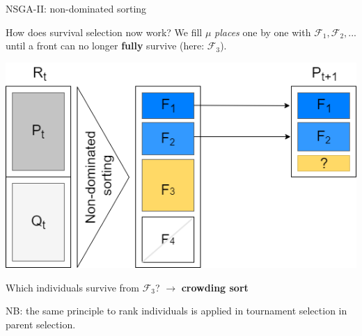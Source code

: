 \begin{frame}[allowframebreaks]{NSGA-II: non-dominated sorting}
\framebreak

How does survival selection now work? We fill $\mu$ \textit{places} one by one with $\mathcal{F}_1, \mathcal{F}_2, ...$ until a front can no longer \textbf{fully} survive (here: $\mathcal{F}_3$).

\begin{center}
\includegraphics[width = 0.45\linewidth]{images/NSGA2_2.png}
\end{center}

Which individuals survive from $\mathcal{F}_3$? $\to$ \textbf{crowding sort}

\vspace{0.3cm}

\footnotesize{NB: the same principle to rank individuals is applied in tournament selection in parent selection.}

\end{frame}

